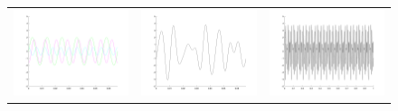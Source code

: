 \begin{figure}[h]
    \centering
    \begin{tabular}{ccc}
        \includegraphics[scale=.125]{pure_tone_cluster.png} & \includegraphics[scale=.125]{pure_tone_sum.png} & \includegraphics[scale=.125]{pure_tone_dense.png}\\

\end{tabular}
\end{figure}
